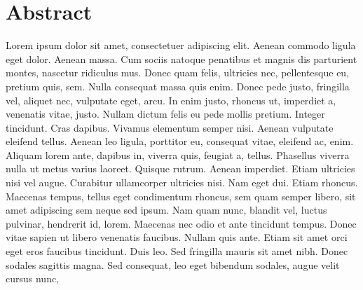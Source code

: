 %
%
%
%
%

\chapter*{Abstract}

Lorem ipsum dolor sit amet, consectetuer adipiscing elit. Aenean commodo ligula eget dolor. Aenean massa. Cum sociis natoque penatibus et magnis dis parturient montes, nascetur ridiculus mus. Donec quam felis, ultricies nec, pellentesque eu, pretium quis, sem. Nulla consequat massa quis enim. Donec pede justo, fringilla vel, aliquet nec, vulputate eget, arcu. In enim justo, rhoncus ut, imperdiet a, venenatis vitae, justo. Nullam dictum felis eu pede mollis pretium. Integer tincidunt. Cras dapibus. Vivamus elementum semper nisi. Aenean vulputate eleifend tellus. Aenean leo ligula, porttitor eu, consequat vitae, eleifend ac, enim. Aliquam lorem ante, dapibus in, viverra quis, feugiat a, tellus. Phasellus viverra nulla ut metus varius laoreet. Quisque rutrum. Aenean imperdiet. Etiam ultricies nisi vel augue. Curabitur ullamcorper ultricies nisi. Nam eget dui. Etiam rhoncus. Maecenas tempus, tellus eget condimentum rhoncus, sem quam semper libero, sit amet adipiscing sem neque sed ipsum. Nam quam nunc, blandit vel, luctus pulvinar, hendrerit id, lorem. Maecenas nec odio et ante tincidunt tempus. Donec vitae sapien ut libero venenatis faucibus. Nullam quis ante. Etiam sit amet orci eget eros faucibus tincidunt. Duis leo. Sed fringilla mauris sit amet nibh. Donec sodales sagittis magna. Sed consequat, leo eget bibendum sodales, augue velit cursus nunc,